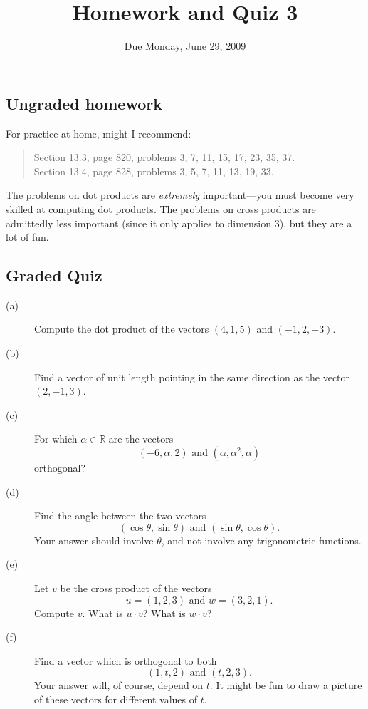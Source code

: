 \documentclass[12pt]{article}
\title{Homework and Quiz 3}
\date{Due Monday, June 29, 2009}
\newcommand{\R}{\mathbb{R}}
\begin{document}
\maketitle

\subsection*{Ungraded homework}

For practice at home, might I recommend:
\begin{quote}
Section 13.3, page 820, problems 3, 7, 11, 15, 17, 23, 35, 37. \\
Section 13.4, page 828, problems 3, 5, 7, 11, 13, 19, 33.
\end{quote}
The problems on dot products are \textit{extremely} important---you
must become very skilled at computing dot products.  The problems on
cross products are admittedly less important (since it only applies to
dimension 3), but they are a lot of fun.

\vfill

\subsection*{Graded Quiz}

\begin{description}
\item[(a)] Compute the dot product of the vectors $(4,1,5)$ and $(-1,2,-3)$.
\vfill
\item[(b)] Find a vector of unit length pointing in the same direction as the vector $(2,-1,3)$.
\vfill
\item[(c)] For which $\alpha \in \R$ are the vectors
$$
(-6,\alpha,2) \mbox{ and } (\alpha,\alpha^2,\alpha)
$$
orthogonal?
\vfill
\item[(d)] Find the angle between the two vectors
$$
(\cos \theta, \sin \theta) \mbox{ and } (\sin \theta, \cos \theta).
$$
Your answer should involve $\theta$, and not involve any trigonometric functions.
\vfill
\item[(e)] Let $v$ be the cross product of the vectors
$$
u = (1,2,3) \mbox{ and } w = (3,2,1).
$$
Compute $v$.  What is $u \cdot v$?  What is $w \cdot v$?
\vfill
\item[(f)] Find a vector which is orthogonal to both
$$
(1,t,2) \mbox{ and } (t,2,3).
$$
Your answer will, of course, depend on $t$.  It might be fun to draw a
picture of these vectors for different values of $t$.
\end{description}
\end{document}
